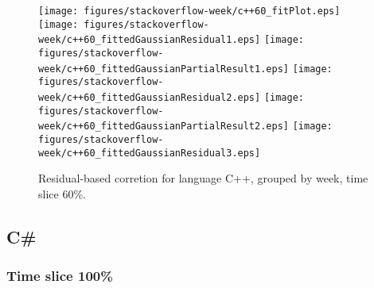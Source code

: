 \begin{figure}[t]
\centering
{}
{\texttt{[image: figures/stackoverflow-week/c++60\_fitPlot.eps]}}
{\texttt{[image: figures/stackoverflow-week/c++60\_fittedGaussianResidual1.eps]}}
{\texttt{[image: figures/stackoverflow-week/c++60\_fittedGaussianPartialResult1.eps]}}
{\texttt{[image: figures/stackoverflow-week/c++60\_fittedGaussianResidual2.eps]}}
{\texttt{[image: figures/stackoverflow-week/c++60\_fittedGaussianPartialResult2.eps]}}
{\texttt{[image: figures/stackoverflow-week/c++60\_fittedGaussianResidual3.eps]}}
\caption{Residual-based corretion for language C++, grouped by week, time slice 60\%.}
\end{figure}


\FloatBarrier


\subsection{C\#}

\subsubsection{Time slice 100\%}

